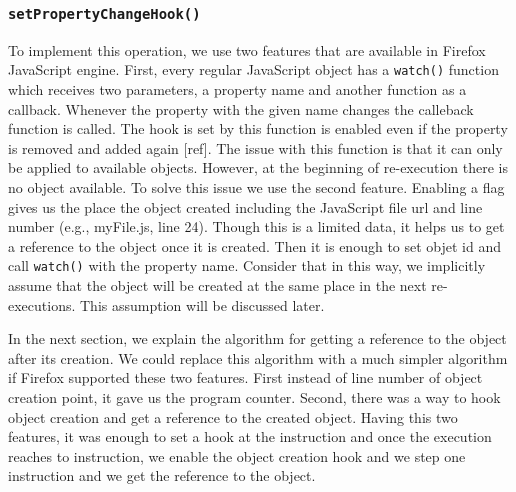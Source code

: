 \documentclass[preprint]{sigplanconf}
\begin{document}
\subsubsection{\texttt{setPropertyChangeHook()}}
To implement this operation, we use two features that are available in Firefox JavaScript engine. First, every regular JavaScript object has a \texttt{watch()} function which receives two parameters, a property name and another function as a callback. Whenever the property with the given name changes the calleback function is called. The hook is set by this function is enabled even if the property is removed and added again [ref]. The issue with this function is that it can only be applied to available objects. However, at the beginning of re-execution there is no object available. To solve this issue we use the second feature. Enabling a flag gives us the place the object created including the JavaScript file url and line number (e.g., myFile.js, line 24). Though this is a limited data, it helps us to get a reference to the object once it is created. Then it is enough to set objet id and call \texttt{watch()} with the property name. Consider that in this way, we implicitly assume that the object will be created at the same place in the next re-executions. This assumption will be discussed later.

In the next section, we explain the algorithm for getting a reference to the object after its creation. We could replace this algorithm with a much simpler algorithm if Firefox supported these two features. First instead of line number of object creation point, it gave us the program counter. Second, there was a way to hook object creation and get a reference to the created object. Having this two features, it was enough to set a hook at the instruction and once the execution reaches to instruction, we enable the object creation hook and we step one instruction and we get the reference to the object.
\end{document}
